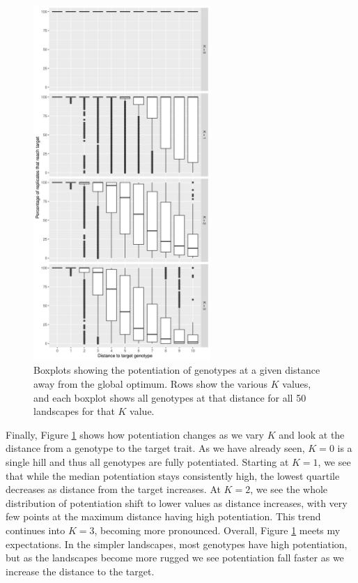 \begin{figure}[h!]
    \centering
    \includegraphics[width=0.6\textwidth]{04_simplified_model/media/potentiation_by_distance_boxplots.png}
    \caption{
        Boxplots showing the potentiation of genotypes at a given distance away from the global optimum. 
        Rows show the various $K$ values, and each boxplot shows all genotypes at that distance for all 50 landscapes for that $K$ value. 
    }
    \label{fig:simplified_model:distance_boxplots}
\end{figure}

Finally, Figure \ref{fig:simplified_model:distance_boxplots} shows how potentiation changes as we vary $K$ and look at the distance from a genotype to the target trait.
As we have already seen, $K = 0$ is a single hill and thus all genotypes are fully potentiated. 
Starting at $K=1$, we see that while the median potentiation stays consistently high, the lowest quartile decreases as distance from the target increases. 
At $K=2$, we see the whole distribution of potentiation shift to lower values as distance increases, with very few points at the maximum distance having high potentiation. 
This trend continues into $K = 3$, becoming more pronounced. 
Overall, Figure \ref{fig:simplified_model:distance_boxplots} meets my expectations. 
In the simpler landscapes, most genotypes have high potentiation, but as the landscapes become more rugged we see potentiation fall faster as we increase the distance to the target. 

